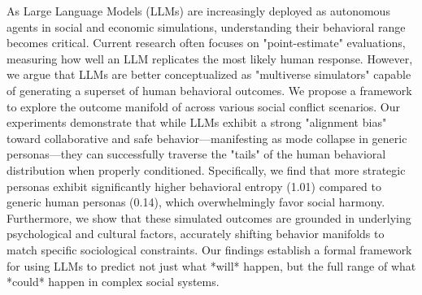 As Large Language Models (LLMs) are increasingly deployed as autonomous agents in social and economic simulations, understanding their behavioral range becomes critical. Current research often focuses on "point-estimate" evaluations, measuring how well an LLM replicates the most likely human response. However, we argue that LLMs are better conceptualized as "multiverse simulators" capable of generating a superset of human behavioral outcomes. We propose a \method framework to explore the outcome manifold of \gpt across various social conflict scenarios. Our experiments demonstrate that while LLMs exhibit a strong "alignment bias" toward collaborative and safe behavior---manifesting as mode collapse in generic personas---they can successfully traverse the "tails" of the human behavioral distribution when properly conditioned. Specifically, we find that more strategic personas exhibit significantly higher behavioral entropy (1.01) compared to generic human personas (0.14), which overwhelmingly favor social harmony. Furthermore, we show that these simulated outcomes are grounded in underlying psychological and cultural factors, accurately shifting behavior manifolds to match specific sociological constraints. Our findings establish a formal framework for using LLMs to predict not just what *will* happen, but the full range of what *could* happen in complex social systems.
